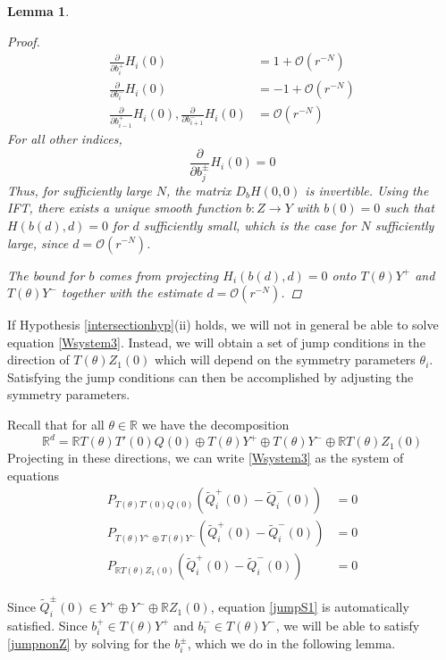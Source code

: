 \documentclass[12pt]{article}
\def\R{{\mathbb R}}
\newtheorem{lemma}{Lemma}
\begin{document}
\begin{lemma}
\begin{proof}
\begin{align*}
\frac{\partial}{\partial b_i^+}H_i(0) &= 1 + \mathcal{O}(r^{-N})  \\
\frac{\partial}{\partial b_i^-}H_i(0) &= -1 + \mathcal{O}(r^{-N}) \\
\frac{\partial}{\partial b_{i-1}^+}H_i(0),
\frac{\partial}{\partial b_{i+1}^-}H_i(0) &= \mathcal{O}(r^{-N})
\end{align*}
For all other indices,
\[
\frac{\partial}{\partial b_j^\pm}H_i(0) = 0
\]
Thus, for sufficiently large $N$, the matrix $D_b H(0,0)$ is invertible. Using the IFT, there exists a unique smooth function $b: Z \rightarrow Y$ with $b(0) = 0$ such that $H(b(d),d) = 0$ for $d$ sufficiently small, which is the case for $N$ sufficiently large, since $d = \mathcal{O}(r^{-N})$.

The bound for $b$ comes from projecting $H_i(b(d), d) = 0$ onto $T(\theta)Y^+$ and $T(\theta)Y^-$ together with the estimate $d = \mathcal{O}(r^{-N})$.
\end{proof}
\end{lemma}

If Hypothesis \ref{intersectionhyp}(ii) holds, we will not in general be able to solve equation \eqref{Wsystem3}. Instead, we will obtain a set of jump conditions in the direction of $T(\theta) Z_1(0)$ which will depend on the symmetry parameters $\theta_i$. Satisfying the jump conditions can then be accomplished by adjusting the symmetry parameters.

Recall that for all $\theta \in \R$ we have the decomposition
\[
\R^d = \R T(\theta) T'(0)Q(0) \oplus T(\theta) Y^+ \oplus T(\theta) Y^- \oplus \R T(\theta) Z_1(0)
\]
Projecting in these directions, we can write \eqref{Wsystem3} as the system of equations
\begin{align}
P_{T(\theta)T'(0)Q(0)}\left( \tilde{Q}_i^+(0) - \tilde{Q}_i^-(0) \right) &= 0 \label{jumpS1} \\
P_{T(\theta)Y^+ \oplus T(\theta)Y^-}\left( \tilde{Q}_i^+(0) - \tilde{Q}_i^-(0) \right) &= 0 \label{jumpnonZ} \\
P_{\R T(\theta)Z_1(0)} \left( \tilde{Q}_i^+(0) - \tilde{Q}_i^-(0) \right) &= 0 \label{jumpZ}
\end{align}

Since $\tilde{Q}_i^\pm(0) \in Y^+ \oplus Y^- \oplus \R Z_1(0)$, equation \ref{jumpS1} is automatically satisfied. Since $b_i^+ \in T(\theta) Y^+$ and $b_i^- \in T(\theta) Y^-$, we will be able to satisfy \eqref{jumpnonZ} by solving for the $b_i^\pm$, which we do in the following lemma.
\end{document}
